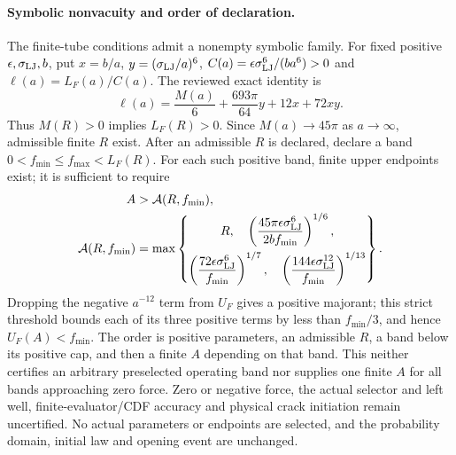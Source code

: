 \documentclass[11pt]{article}
\begin{document}
\paragraph{Symbolic nonvacuity and order of declaration.}
The finite-tube conditions admit a nonempty symbolic family.
For fixed positive $\epsilon,\sigma_{\rm LJ},b$, put
$x=b/a$, $y=(\sigma_{\rm LJ}/a)^6$,
$C(a)=\epsilon\sigma_{\rm LJ}^6/(ba^6)>0$ and
$\ell(a)=L_F(a)/C(a)$. The reviewed exact identity is
\begin{equation}
 \ell(a)=\frac{M(a)}6+\frac{693\pi}{64}y+12x+72xy .
\end{equation}
Thus $M(R)>0$ implies $L_F(R)>0$.
Since $M(a)\to45\pi$ as $a\to\infty$, admissible finite $R$ exist.
After an admissible $R$ is declared, declare a band
$0<f_{\min}\leq f_{\max}<L_F(R)$.
For each such positive band, finite upper endpoints exist; it is sufficient to require
\begin{equation}
\begin{aligned}
 A&>\mathcal A(R,f_{\min}),\\
 \mathcal A(R,f_{\min})&=\max\left\{
 \begin{gathered}
 R,\quad
 \left(\frac{45\pi\epsilon\sigma_{\rm LJ}^6}{2bf_{\min}}\right)^{1/6},\\
 \left(\frac{72\epsilon\sigma_{\rm LJ}^6}{f_{\min}}\right)^{1/7},
 \quad
 \left(\frac{144\epsilon\sigma_{\rm LJ}^{12}}{f_{\min}}\right)^{1/13}
 \end{gathered}\right\}.
\end{aligned}
\end{equation}
Dropping the negative $a^{-12}$ term from $U_F$ gives a positive
majorant; this strict threshold bounds each of its three positive
terms by less than $f_{\min}/3$, and hence $U_F(A)<f_{\min}$.
The order is positive parameters, an admissible $R$, a band below
its positive cap, and then a finite $A$ depending on that band.
This neither certifies an arbitrary preselected operating band nor
supplies one finite $A$ for all bands approaching zero force.
Zero or negative force, the actual selector and left well,
finite-evaluator/CDF accuracy and physical crack initiation remain
uncertified. No actual parameters or endpoints are selected, and the
probability domain, initial law and opening event are unchanged.
\end{document}
